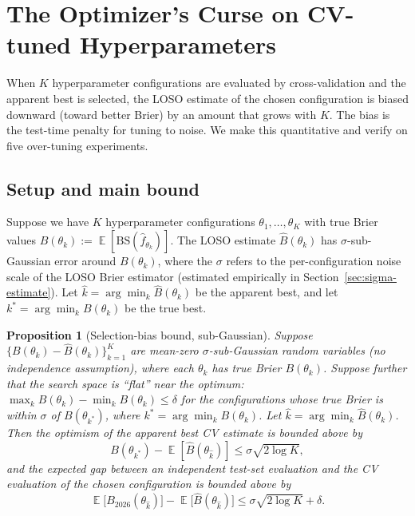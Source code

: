 \documentclass[11pt,a4paper]{article}
\newtheorem{proposition}[theorem]{Proposition}
\theoremstyle{definition}
\DeclareMathOperator{\E}{\mathbb{E}}
\newcommand{\BS}{\mathrm{BS}}
\begin{document}
\section{The Optimizer's Curse on CV-tuned Hyperparameters}\label{sec:opt}

When $K$ hyperparameter configurations are evaluated by cross-validation and the apparent best is selected, the LOSO estimate of the chosen configuration is biased downward (toward better Brier) by an amount that grows with $K$. The bias is the test-time penalty for tuning to noise. We make this quantitative and verify on five over-tuning experiments.

\subsection{Setup and main bound}

Suppose we have $K$ hyperparameter configurations $\theta_1, \dots, \theta_K$ with true Brier values $B(\theta_k) := \E[\BS(\hat{f}_{\theta_k})]$. The LOSO estimate $\hat{B}(\theta_k)$ has $\sigma$-sub-Gaussian error around $B(\theta_k)$, where the $\sigma$ refers to the per-configuration noise scale of the LOSO Brier estimator (estimated empirically in Section~\ref{sec:sigma-estimate}). Let $\hat{k} = \arg\min_k \hat{B}(\theta_k)$ be the apparent best, and let $k^* = \arg\min_k B(\theta_k)$ be the true best.

\begin{proposition}[Selection-bias bound, sub-Gaussian]\label{prop:opt-curse}
Suppose $\{B(\theta_k) - \hat{B}(\theta_k)\}_{k=1}^K$ are mean-zero $\sigma$-sub-Gaussian random variables (no independence assumption), where each $\theta_k$ has true Brier $B(\theta_k)$. Suppose further that the search space is ``flat'' near the optimum: $\max_k B(\theta_k) - \min_k B(\theta_k) \le \delta$ for the configurations whose true Brier is within $\sigma$ of $B(\theta_{k^*})$, where $k^* = \arg\min_k B(\theta_k)$. Let $\hat{k} = \arg\min_k \hat{B}(\theta_k)$. Then the optimism of the apparent best CV estimate is bounded above by
\[
B(\theta_{k^*}) - \E[\hat{B}(\theta_{\hat{k}})] \le \sigma \sqrt{2 \log K},
\]
and the expected gap between an independent test-set evaluation and the CV evaluation of the chosen configuration is bounded above by
\[
\E\bigl[B_{2026}(\theta_{\hat{k}})\bigr] - \E\bigl[\hat{B}(\theta_{\hat{k}})\bigr] \le \sigma \sqrt{2 \log K} + \delta.
\]
\end{proposition}
\end{document}

